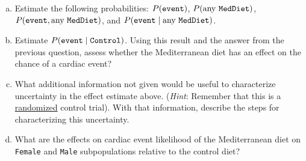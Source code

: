 \documentclass[11pt]{article}
\begin{document}
\begin{enumerate}[a.]
	\item Estimate the following probabilities: $P({\tt event })$, $P(\text{any {\tt MedDiet}})$, $P({\tt event },\text{any {\tt MedDiet}})$, and $P({\tt event } \mid \text{any {\tt MedDiet}})$.
	\item Estimate $P({\tt event } \mid \text{{\tt Control}})$.  Using this result and the answer from the previous question, assess whether the Mediterranean diet has an effect on the chance of a cardiac event?  
	\item What additional information not given would be useful to characterize uncertainty in the effect estimate above.  (\textit{Hint}: Remember that this is a \underline{randomized} control trial).  With that information, describe the steps for characterizing this uncertainty.
	\item What are the effects on cardiac event likelihood of the Mediterranean diet on {\tt Female} and {\tt Male} subpopulations relative to the control diet? 
\end{enumerate} 
\end{document}
